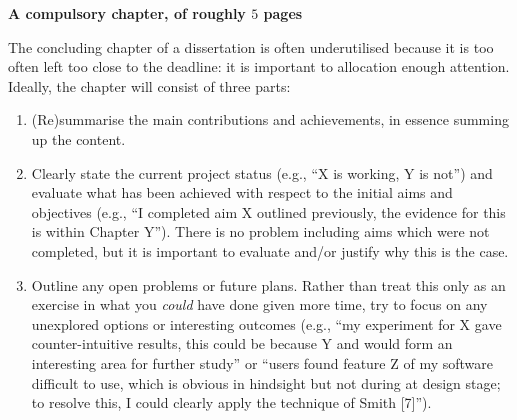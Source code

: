 \documentclass[ draft,
                    author={Alexander Hill},
                supervisor={Dr. Benjamin Sach},
                    degree={MEng},
                     title={MARMOSET: Multi Agent Real-time Multi-core Online
                     Simulation for Efficient Transportation},
                  subtitle={},
                      type={research},
                      year={2016} ]{dissertation}
\begin{document}
{\bf A compulsory chapter,     of roughly $5$ pages}
\vspace{1cm}

\noindent
The concluding chapter of a dissertation is often underutilised because it
is too often left too close to the deadline: it is important to allocation
enough attention.  Ideally, the chapter will consist of three parts:

\begin{enumerate}
\item (Re)summarise the main contributions and achievements, in essence
      summing up the content.
\item Clearly state the current project status (e.g., ``X is working, Y
      is not'') and evaluate what has been achieved with respect to the
      initial aims and objectives (e.g., ``I completed aim X outlined
      previously, the evidence for this is within Chapter Y'').  There
      is no problem including aims which were not completed, but it is
      important to evaluate and/or justify why this is the case.
\item Outline any open problems or future plans.  Rather than treat this
      only as an exercise in what you {\em could} have done given more
      time, try to focus on any unexplored options or interesting outcomes
      (e.g., ``my experiment for X gave counter-intuitive results, this
      could be because Y and would form an interesting area for further
      study'' or ``users found feature Z of my software difficult to use,
      which is obvious in hindsight but not during at design stage; to
      resolve this, I could clearly apply the technique of Smith [7]'').
\end{enumerate}


%
%
\end{document}

